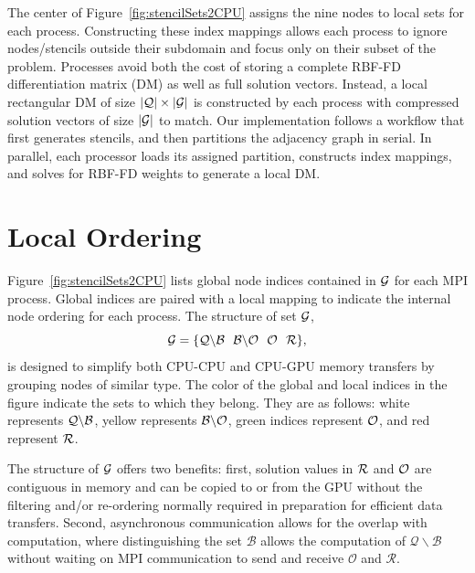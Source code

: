 \documentclass{report}
\begin{document}
The center of Figure~\ref{fig:stencilSets2CPU} assigns the nine nodes to local sets for each process. Constructing these index mappings allows each process to ignore nodes/stencils outside their subdomain and focus only on their subset of the problem. Processes avoid both the cost of storing a complete RBF-FD differentiation matrix (DM) as well as full solution vectors. Instead, a local rectangular DM of size $|\mathcal{Q}| \times |\mathcal{G}|$ is constructed by each process with compressed solution vectors of size $|\mathcal{G}|$ to match. Our implementation follows a workflow that first generates stencils, and then partitions the adjacency graph in serial. In parallel, each processor loads its assigned partition, constructs index mappings, and solves for RBF-FD weights to generate a local DM.  

\section{Local Ordering}
\label{sec:local_ordering}

Figure~\ref{fig:stencilSets2CPU} lists global node indices contained in $\mathcal{G}$ for each MPI process. Global indices are paired with a local mapping to indicate the internal node ordering for each process. The structure of set $\mathcal{G}$,
   \begin{equation}
 		\setAllNodes = \{ \mathcal{Q}\backslash\mathcal{B} \ \ \mathcal{B}\backslash\mathcal{O} \ \ \mathcal{O} \ \ \setDepend \},
            \label{eq:decompose_g}
        \end{equation}
 is designed to simplify both CPU-CPU and CPU-GPU memory transfers by grouping nodes of similar type. The color of the global and local indices in the figure
 indicate the sets to which they belong. They are as follows: white represents $\mathcal{Q} \backslash \mathcal{B}$, 
 yellow represents $\mathcal{B} \backslash \mathcal{O}$, green indices 
 represent $\mathcal{O}$, and red represent $\mathcal{R}$.  


 The structure of $\mathcal{G}$ offers two benefits: first, solution values in $\mathcal{R}$ and $\mathcal{O}$ are contiguous in memory and can be copied to or from the GPU without the filtering and/or re-ordering normally required in preparation for efficient data transfers. Second, asynchronous communication allows for the overlap with computation, where distinguishing the set $\mathcal{B}$ allows the computation of $\mathcal{Q}\backslash \mathcal{B}$ without waiting on MPI communication to send and receive $\mathcal{O}$ and $\mathcal{R}$. 
\end{document}

